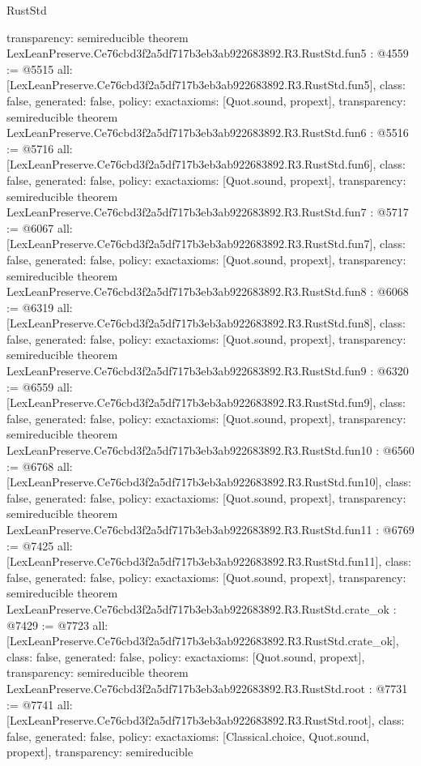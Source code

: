 \begin{lexlean}{RustStd}
\begin{coremodule}
{  transparency: semireducible
}
theorem LexLeanPreserve.Ce76cbd3f2a5df717b3eb3ab922683892.R3.RustStd.fun5 : @4559 := @5515 {
  all: [LexLeanPreserve.Ce76cbd3f2a5df717b3eb3ab922683892.R3.RustStd.fun5],
  class: false,
  generated: false,
  policy: exact{axioms: [Quot.sound, propext]},
  transparency: semireducible
}
theorem LexLeanPreserve.Ce76cbd3f2a5df717b3eb3ab922683892.R3.RustStd.fun6 : @5516 := @5716 {
  all: [LexLeanPreserve.Ce76cbd3f2a5df717b3eb3ab922683892.R3.RustStd.fun6],
  class: false,
  generated: false,
  policy: exact{axioms: [Quot.sound, propext]},
  transparency: semireducible
}
theorem LexLeanPreserve.Ce76cbd3f2a5df717b3eb3ab922683892.R3.RustStd.fun7 : @5717 := @6067 {
  all: [LexLeanPreserve.Ce76cbd3f2a5df717b3eb3ab922683892.R3.RustStd.fun7],
  class: false,
  generated: false,
  policy: exact{axioms: [Quot.sound, propext]},
  transparency: semireducible
}
theorem LexLeanPreserve.Ce76cbd3f2a5df717b3eb3ab922683892.R3.RustStd.fun8 : @6068 := @6319 {
  all: [LexLeanPreserve.Ce76cbd3f2a5df717b3eb3ab922683892.R3.RustStd.fun8],
  class: false,
  generated: false,
  policy: exact{axioms: [Quot.sound, propext]},
  transparency: semireducible
}
theorem LexLeanPreserve.Ce76cbd3f2a5df717b3eb3ab922683892.R3.RustStd.fun9 : @6320 := @6559 {
  all: [LexLeanPreserve.Ce76cbd3f2a5df717b3eb3ab922683892.R3.RustStd.fun9],
  class: false,
  generated: false,
  policy: exact{axioms: [Quot.sound, propext]},
  transparency: semireducible
}
theorem LexLeanPreserve.Ce76cbd3f2a5df717b3eb3ab922683892.R3.RustStd.fun10 : @6560 := @6768 {
  all: [LexLeanPreserve.Ce76cbd3f2a5df717b3eb3ab922683892.R3.RustStd.fun10],
  class: false,
  generated: false,
  policy: exact{axioms: [Quot.sound, propext]},
  transparency: semireducible
}
theorem LexLeanPreserve.Ce76cbd3f2a5df717b3eb3ab922683892.R3.RustStd.fun11 : @6769 := @7425 {
  all: [LexLeanPreserve.Ce76cbd3f2a5df717b3eb3ab922683892.R3.RustStd.fun11],
  class: false,
  generated: false,
  policy: exact{axioms: [Quot.sound, propext]},
  transparency: semireducible
}
theorem LexLeanPreserve.Ce76cbd3f2a5df717b3eb3ab922683892.R3.RustStd.crate_ok : @7429 := @7723 {
  all: [LexLeanPreserve.Ce76cbd3f2a5df717b3eb3ab922683892.R3.RustStd.crate_ok],
  class: false,
  generated: false,
  policy: exact{axioms: [Quot.sound, propext]},
  transparency: semireducible
}
theorem LexLeanPreserve.Ce76cbd3f2a5df717b3eb3ab922683892.R3.RustStd.root : @7731 := @7741 {
  all: [LexLeanPreserve.Ce76cbd3f2a5df717b3eb3ab922683892.R3.RustStd.root],
  class: false,
  generated: false,
  policy: exact{axioms: [Classical.choice, Quot.sound, propext]},
  transparency: semireducible
}


\end{coremodule}
\end{lexlean}
